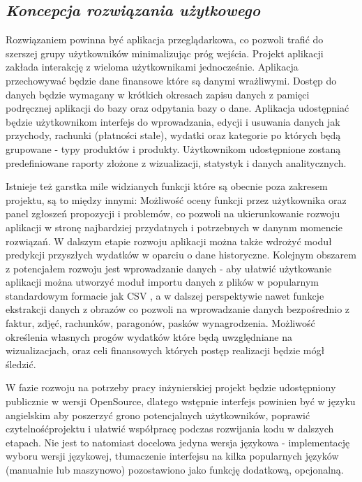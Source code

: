 \documentclass[a4paper,10pt, twoside]{report}
\newcommand{\customstylesection}[1]{\textbf{\textit{#1}}}
\begin{document}
\begin{large}
\section{\customstylesection{Koncepcja rozwiązania użytkowego}}
{Rozwiązaniem powinna być aplikacja przeglądarkowa, co pozwoli trafić do 
szerszej grupy użytkowników minimalizując próg wejścia. Projekt aplikacji 
zakłada interakcję z wieloma użytkownikami jednocześnie. Aplikacja przechowywać 
będzie dane finansowe które są danymi wrażliwymi. Dostęp do danych będzie 
wymagany w krótkich okresach zapisu danych z pamięci podręcznej aplikacji do 
bazy oraz odpytania bazy o dane. Aplikacja udostępniać będzie użytkownikom 
interfejs do wprowadzania, edycji i usuwania danych jak przychody, rachunki 
(płatności stałe), wydatki oraz kategorie po których będą grupowane - typy 
produktów i produkty. Użytkownikom udostępnione zostaną predefiniowane raporty 
złożone z wizualizacji, statystyk i danych analitycznych.}

\medskip
{Istnieje też garstka mile widzianych funkcji które są obecnie poza zakresem 
projektu, są to między innymi: Możliwość oceny funkcji przez 
użytkownika oraz panel zgłoszeń propozycji i problemów, co pozwoli na 
ukierunkowanie rozwoju aplikacji w stronę najbardziej przydatnych i potrzebnych 
w danynm momencie rozwiązań. W dalszym etapie rozwoju aplikacji można także 
wdrożyć moduł predykcji przyszłych wydatków w oparciu o dane historyczne. 
Kolejnym obszarem z potencjałem rozwoju jest wprowadzanie danych - aby ułatwić 
użytkowanie aplikacji można utworzyć moduł importu danych z plików w popularnym 
standardowym formacie jak CSV \cite{CSV}, a w dalszej perspektywie nawet funkcje
 ekstrakcji danych z obrazów co pozwoli na wprowadzanie danych bezpośrednio z 
faktur, zdjęć, rachunków, paragonów, pasków wynagrodzenia. Możliwość określenia 
własnych progów wydatków które będą uwzględniane na wizualizacjach, oraz celi 
finansowych których postęp realizacji będzie mógł śledzić.}

{W fazie rozwoju na potrzeby pracy inżynierskiej projekt będzie udostępniony 
publicznie w wersji OpenSource, dlatego wstępnie interfejs powinien być w 
języku angielskim aby poszerzyć grono potencjalnych użytkowników, poprawić 
czytelnośćprojektu i ułatwić współpracę podczas rozwijania kodu w dalszych 
etapach. Nie jest to natomiast docelowa jedyna wersja językowa - implementację 
wyboru wersji językowej, tłumaczenie interfejsu na kilka popularnych języków 
(manualnie lub maszynowo) pozostawiono jako funkcję dodatkową, opcjonalną.}


\end{large}
\end{document}
